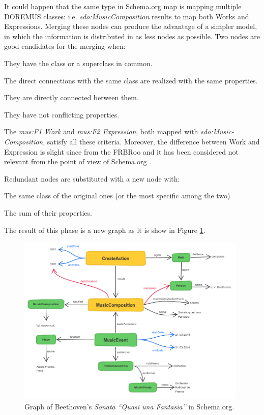 \documentclass{llncs}
\begin{document}
It could happen that the same type in Schema.org map is mapping multiple DOREMUS classes: i.e. \textit{sdo:MusicComposition} results to map both Works and Expressions. Merging these nodes can produce the advantage of a simpler model, in which the information is distributed in as less nodes as possible. Two nodes are good candidates for the merging when:
\begin{enumerate*}
\item{They have the class or a superclass in common.}
\item{The direct connections with the same class are realized with the same properties.}
\item{They are directly connected between them.}
\item{They have not conflicting properties.}
\end{enumerate*} The \textit{mus:F1 Work} and \textit{mus:F2 Expression}, both mapped with \textit{sdo:Music-Composition}, satisfy all these criteria. Moreover, the difference between Work and Expression is slight since from the FRBRoo and it has been considered not relevant from the point of view of Schema.org \cite{godby2013relationship}.

Redundant nodes are substituted with a new node with:
\begin{enumerate*}
\item{The same class of the original ones (or the most specific among the two)}
\item{The sum of their properties.}
\end{enumerate*}
The result of this phase is a new graph as it is show in Figure \ref{fig:beet-schema}.

\begin{figure}
\centering
\includegraphics[width=11cm]{img/Beethoven-Schema.png}
\caption{Graph of Beethoven's \textit{Sonata ``Quasi una Fantasia''} in Schema.org.}
\label{fig:beet-schema}
\end{figure}
\end{document}
